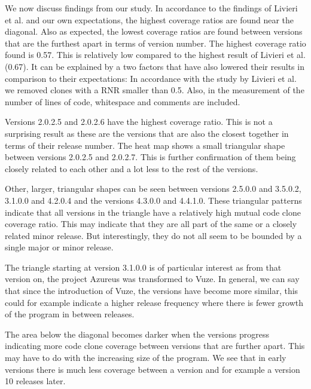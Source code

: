 \documentclass[a4paper,twoside, twocolumn, 11pt]{article}
\numberwithin{equation}{section}
\begin{document}
We now discuss findings from our study.
In accordance to the findings of Livieri et al. and our own expectations, the highest coverage ratios are found near the diagonal.
Also as expected, the lowest coverage ratios are found between versions that are the furthest apart in terms of version number.
The highest coverage ratio found is 0.57. This is relatively low compared to the highest result of Livieri et al. (0.67).
It can be explained by a two factors that have also lowered their results in comparison to their expectations:
In accordance with the study by Livieri et al. we removed clones with a RNR smaller than 0.5. 
Also, in the measurement of the number of lines of code, whitespace and comments are included.

Versions 2.0.2.5 and 2.0.2.6 have the highest coverage ratio.
This is not a surprising result as these are the versions that are also the closest together in terms of their release number. 
The heat map shows a small triangular shape between versions 2.0.2.5 and 2.0.2.7. 
This is further confirmation of them being closely related to each other and a lot less to the rest of the versions.

Other, larger, triangular shapes can be seen between versions 2.5.0.0 and 3.5.0.2, 3.1.0.0 and 4.2.0.4 and the versions 4.3.0.0 and 4.4.1.0.
These triangular patterns indicate that all versions in the triangle have a relatively high mutual code clone coverage ratio.
This may indicate that they are all part of the same or a closely related minor release.
But interestingly, they do not all seem to be bounded by a single major or minor release.

The triangle starting at version 3.1.0.0 is of particular interest as from that version on, the project Azureus was transformed to Vuze.
In general, we can say that since the introduction of Vuze, the versions have become more similar, this could for example indicate a higher release frequency where there is fewer growth of the program in between releases.

The area below the diagonal becomes darker when the versions progress indicating more code clone coverage between versions that are further apart.
This may have to do with the increasing size of the program. 
We see that in early versions there is much less coverage between a version and for example a version 10 releases later.
\end{document}
